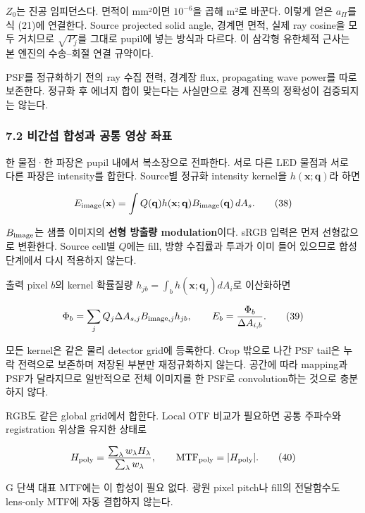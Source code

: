 \documentclass[
  a4paper,
]{article}
\begin{document}
\(Z_0\)는 진공 임피던스다. 면적이 mm²이면 \(10^{-6}\)을 곱해 m²로
바꾼다. 이렇게 얻은 \(a_\Pi\)를 식 (21)에 연결한다. Source projected
solid angle, 경계면 면적, 실제 ray cosine을 모두 거치므로
\(\sqrt{P_j}\)를 그대로 pupil에 넣는 방식과 다르다. 이 삼각형 유한체적
근사는 본 엔진의 수송--회절 연결 규약이다.

PSF를 정규화하기 전의 ray 수집 전력, 경계장 flux, propagating wave
power를 따로 보존한다. 정규화 후 에너지 합이 맞는다는 사실만으로 경계
진폭의 정확성이 검증되지는 않는다.

\hypertarget{uxbe44uxac04uxc12d-uxd569uxc131uxacfc-uxacf5uxd1b5-uxc601uxc0c1-uxc88cuxd45c}{%
\subsubsection{7.2 비간섭 합성과 공통 영상
좌표}\label{uxbe44uxac04uxc12d-uxd569uxc131uxacfc-uxacf5uxd1b5-uxc601uxc0c1-uxc88cuxd45c}}

한 물점·한 파장은 pupil 내에서 복소장으로 전파한다. 서로 다른 LED 물점과
서로 다른 파장은 intensity를 합한다. Source별 정규화 intensity kernel을
\(h(\mathbf x;\mathbf q)\)라 하면

\[
E_{\rm image}(\mathbf x)=\int Q(\mathbf q)h(\mathbf x;\mathbf q)
 B_{\rm image}(\mathbf q)\,dA_s.
\tag{38}
\]

\(B_{\rm image}\)는 샘플 이미지의 \textbf{선형 방출량 modulation}이다.
sRGB 입력은 먼저 선형값으로 변환한다. Source cell별 \(Q\)에는 fill, 방향
수집률과 투과가 이미 들어 있으므로 합성 단계에서 다시 적용하지 않는다.

출력 pixel \(b\)의 kernel 확률질량
\(h_{jb}=\int_bh(\mathbf x;\mathbf q_j)dA_i\)로 이산화하면

\[
\Phi_b=\sum_jQ_j\Delta A_{s,j}B_{{\rm image},j}h_{jb},
\qquad E_b=\frac{\Phi_b}{\Delta A_{i,b}}.
\tag{39}
\]

모든 kernel은 같은 물리 detector grid에 등록한다. Crop 밖으로 나간 PSF
tail은 누락 전력으로 보존하며 저장된 부분만 재정규화하지 않는다. 공간에
따라 mapping과 PSF가 달라지므로 일반적으로 전체 이미지를 한 PSF로
convolution하는 것으로 충분하지 않다.

RGB도 같은 global grid에서 합한다. Local OTF 비교가 필요하면 공통
주파수와 registration 위상을 유지한 상태로

\[
H_{\rm poly}=\frac{\sum_\lambda w_\lambda H_\lambda}{\sum_\lambda w_\lambda},
\qquad\mathrm{MTF}_{\rm poly}=|H_{\rm poly}|.
\tag{40}
\]

G 단색 대표 MTF에는 이 합성이 필요 없다. 광원 pixel pitch나 fill의
전달함수도 lens-only MTF에 자동 결합하지 않는다.
\end{document}

